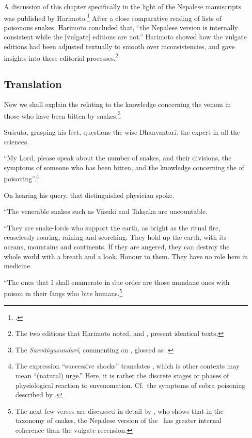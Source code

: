 A discussion of this chapter specifically in the light of the Nepalese
manuscripts was published by Harimoto.\footcite[101--104]{hari-2011} After a
close comparative reading of lists of poisonous snakes, Harimoto concluded
that, “the Nepalese version is internally consistent while the [vulgate]
editions are not.”  Harimoto showed how the vulgate editions had been
adjusted textually to smooth over inconsistencies, and gave insights into
these editorial processes.\footnote{The two editions that Harimoto noted,
    \cite{vulgate} and \cite{bhat-1889}, present identical texts.}


\subsection{Translation}

\begin{translation}
    \item[1] Now we shall explain the  relating to the
knowledge concerning the venom in those who have been bitten by
snakes.\footnote{The \emph{Sarvāṅgasundarī}, commenting on
    , glossed  as .}
    
    \item[3] Suśruta, grasping his feet, questions the wise Dhanvantari, the 
    expert in all the sciences.
    
    \item[4]
    
    “My Lord, please speak about the number of snakes, and their divisions,
the symptoms of someone who has been bitten, and the knowledge
concerning the  of poisoning”.\footnote{The
    expression “successive shocks” translates , which is other
    contexts may mean “(natural) urge.”  Here, it is rather the discrete
    stages or phases of physiological reaction to envenomation.  Cf.\ the
    symptoms of cobra poisoning described by \citet[80]{wall-1913}.}
        
    \item[5]
    
    On hearing his query, that distinguished physician spoke.
    
    “The venerable snakes such as Vāsukī and Takṣaka are uncountable. 
    
\item[6--9ab]

“They are snake-lords who support the earth, as bright as the ritual fire,
ceaselessly roaring, raining and scorching. They hold up the earth, with its
oceans, mountains and continents. If they are angered, they can destroy the
whole world with a breath and a look.  Honour to them. They have no role
here in medicine.

“The ones that I shall enumerate in due order are those mundane
ones with poison in their fangs who bite humans.\footnote{The next few
    verses are discussed in detail by \citet[101--104]{hari-2011}, who shows
    that in the taxonomy of snakes, the Nepalese version of the \SS\ has greater
    internal coherence than the vulgate recension.}


\end{translation}

